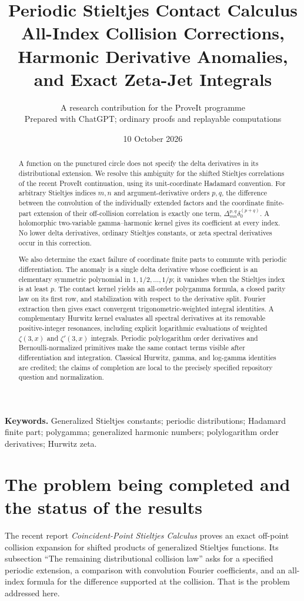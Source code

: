 \documentclass[11pt,a4paper]{article}
\title{\textbf{Periodic Stieltjes Contact Calculus}\\[6pt]
\large All-Index Collision Corrections, Harmonic Derivative Anomalies,\\
and Exact Zeta-Jet Integrals}
\author{A research contribution for the ProveIt programme\\
\small Prepared with ChatGPT; ordinary proofs and replayable computations}
\date{10 October 2026}
\numberwithin{equation}{section}
\theoremstyle{definition}
\begin{document}
\maketitle
\begin{abstract}
A function on the punctured circle does not specify the delta derivatives in its distributional extension. We resolve this ambiguity for the shifted Stieltjes correlations of the recent ProveIt continuation, using its unit-coordinate Hadamard convention. For arbitrary Stieltjes indices $m,n$ and argument-derivative orders $p,q$, the difference between the convolution of the individually extended factors and the coordinate finite-part extension of their off-collision correlation is exactly one term, $\Delta_{mn}^{p,q}\delta_0^{(p+q)}$. A holomorphic two-variable gamma--harmonic kernel gives its coefficient at every index. No lower delta derivatives, ordinary Stieltjes constants, or zeta spectral derivatives occur in this correction.

We also determine the exact failure of coordinate finite parts to commute with periodic differentiation. The anomaly is a single delta derivative whose coefficient is an elementary symmetric polynomial in $1,1/2,\ldots,1/p$; it vanishes when the Stieltjes index is at least $p$. The contact kernel yields an all-order polygamma formula, a closed parity law on its first row, and stabilization with respect to the derivative split. Fourier extraction then gives exact convergent trigonometric-weighted integral identities. A complementary Hurwitz kernel evaluates all spectral derivatives at its removable positive-integer resonances, including explicit logarithmic evaluations of weighted $\zeta(3,x)$ and $\zeta'(3,x)$ integrals. Periodic polylogarithm order derivatives and Bernoulli-normalized primitives make the same contact terms visible after differentiation and integration. Classical Hurwitz, gamma, and log-gamma identities are credited; the claims of completion are local to the precisely specified repository question and normalization.
\end{abstract}
\noindent\textbf{Keywords.} Generalized Stieltjes constants; periodic distributions; Hadamard finite part; polygamma; generalized harmonic numbers; polylogarithm order derivatives; Hurwitz zeta.
\newpage
\tableofcontents
\newpage

\section{The problem being completed and the status of the results}\label{pc:scope}
The recent report \emph{Coincident-Point Stieltjes Calculus} \cite{pc:coincident} proves an exact off-point collision expansion for shifted products of generalized Stieltjes functions. Its subsection ``The remaining distributional collision law'' asks for a specified periodic extension, a comparison with convolution Fourier coefficients, and an all-index formula for the difference supported at the collision. That is the problem addressed here.
\end{document}
